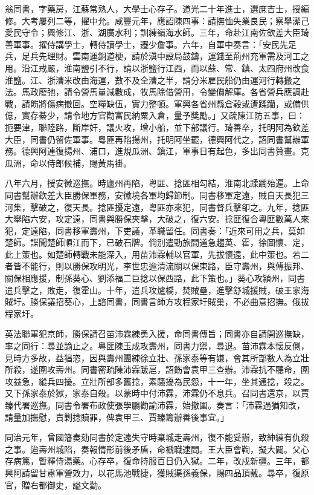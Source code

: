 \begin{pinyinscope}
翁同書，字藥房，江蘇常熟人，大學士心存子。道光二十年進士，選庶吉士，授編修。大考屢列二等，擢中允。咸豐元年，應詔陳四事：請撫恤失業良民；察舉潔己愛民守令；興修江、浙、湖廣水利；訓練嶺海水師。三年，命赴江南佐欽差大臣琦善軍事。擢侍講學士，轉侍讀學士，遷少詹事。六年，自軍中奏言：「安民先足兵，足兵先理財。雲南運銅道梗，請於滇中設局鼓鑄，運錢至荊州充軍需及河工之用。沿江戒嚴，淮南鹽引不行，請以浙鹽行江西，而以蘇、常、鎮、太四府州改食淮鹽。江、浙漕米改由海運，數不及全漕之半，請分米雇民船仍由運河行轉搬之法。馬政廢弛，請令營馬量減數成，牧馬除借營用，令變價解庫。各省營兵應調赴戰，請飭將傷病撤回。空糧缺伍，實力整頓。軍興各省州縣倉穀或遭蹂躪，或備供億，實存綦少，請令地方官勸富民納粟入倉，量予獎勵。」又疏陳江防五事，曰：扼要津，聯陸路，斷岸奸，議火攻，增小船，並下部議行。琦善卒，托明阿為欽差大臣，同書仍留佐軍事。粵匪再陷揚州，托明阿坐罷，德興阿代之，詔同書幫辦軍務。德興阿連復揚州、浦口，進規瓜洲、鎮江，軍事日有起色，多出同書贊畫。克瓜洲，命以侍郎候補，賜黃馬褂。

八年六月，授安徽巡撫。時廬州再陷，粵匪、捻匪相勾結，淮南北蹂躪殆遍。上命同書幫辦欽差大臣勝保軍務，安徽境各軍均歸節制。同書移軍定遠，賊自天長犯三河集，擊破之，復天長。捻匪擾定遠，粵匪亦來犯，同書督兵擊卻之。九年，捻匪大舉陷六安，攻定遠，同書與勝保夾擊，大破之，復六安。捻匪復合粵匪數萬人來犯，定遠陷，同書移軍壽州，下吏議，革職留任。同書奏：「近來可用之兵，莫如楚師。諜聞楚師順江而下，已破石牌。倘別遣勁旅間道急趨英、霍，徐圖懷、定，此上策也。如楚師轉戰未能深入，用苗沛霖輔以官軍，先拔懷遠，此中策也。若二者皆不能行，則以勝保攻明光，李世忠逾清流關以保東路，臣守壽州，與傅振邦、關保相應援，制孫葵心、劉添福二巨捻以保西路，此下策也。」葵心攻潁州，同書遣兵擊之，敗走，復霍山。十年，遣兵攻爐橋，焚賊壘，進擊舒城援賊，破王家海賊圩。勝保議招葵心，上諮同書，同書言師方攻程家圩賊巢，不必曲意招撫。俄拔程家圩。

英法聯軍犯京師，勝保請召苗沛霖練勇入援，命同書傳旨；同書亦自請開巡撫缺，率之同行：尋並諭止之。粵匪陳玉成攻壽州，同書力禦，尋退。苗沛霖本懷反側，見時方多故，益猖恣，因與壽州團練徐立壯、孫家泰等有嫌，會其所部數人為立壯所殺，遂圍攻壽州。同書密疏陳沛霖跋扈，詔飭會袁甲三查辦。沛霖抗不聽命，圍攻益急，縱兵四擾。立壯所部多舊捻，素騷擾為民怨，十一年，坐其通捻，殺之。又下孫家泰於獄，家泰自殺。以蒙時中付沛霖，沛霖仍不息兵。召同書還京，以賈臻代署巡撫。同書令署布政使張學鵬勸諭沛霖，始撤圍。奏言：「沛霖過猶知改，請量加撫慰，責剿捻贖罪，俾袁甲三、賈臻籌辦善後事宜。」

同治元年，曾國籓奏劾同書於定遠失守時棄城走壽州，復不能妥辦，致紳練有仇殺之事。迨壽州城陷，奏報情形前後矛盾，命褫職逮問。王大臣會鞫，擬大闢。父心存病篤，暫釋侍湯藥。心存卒，復命持服百日仍入獄。二年，改戍新疆。三年，都興阿請留甘肅軍營效力，以花馬池戰捷，獲賊渠孫義保，賜四品頂戴。尋卒，復原官，贈右都御史，謚文勤。


\end{pinyinscope}
